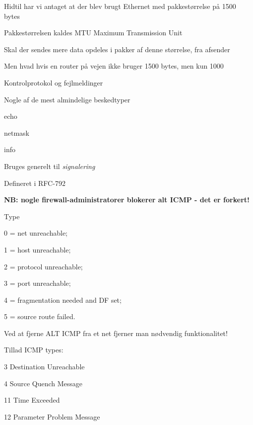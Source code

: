\documentclass[Screen16to9,17pt]{foils}
\begin{document}

\begin{list1}
\item Hidtil har vi antaget at der blev brugt Ethernet med pakkestørrelse på 1500 bytes
\item Pakkestørrelsen kaldes MTU Maximum Transmission Unit
\item Skal der sendes mere data opdeles i pakker af denne størrelse, fra afsender
\item Men hvad hvis en router på vejen ikke bruger 1500 bytes, men kun 1000
\end{list1}


\begin{list1}
\item Kontrolprotokol og fejlmeldinger
\item Nogle af de mest almindelige beskedtyper
\begin{list2}
\item echo
\item netmask
\item info
\end{list2}
\item Bruges generelt til \emph{signalering}
\item Defineret i RFC-792
\end{list1}

\centerline{\bf NB: nogle firewall-administratorer blokerer alt ICMP - det er forkert!}


\begin{list1}
\item Type
\begin{list2}
\item 0 = net unreachable;
\item 1 = host unreachable;
\item 2 = protocol unreachable;
\item 3 = port unreachable;
\item 4 = fragmentation needed and DF set;
\item 5 = source route failed.
\end{list2}
\item Ved at fjerne ALT ICMP fra et net fjerner man nødvendig funktionalitet!
\item Tillad ICMP types:
\begin{list2}
\item 3 Destination Unreachable
\item 4 Source Quench Message
\item 11 Time Exceeded
\item 12 Parameter Problem Message
\end{list2}
\end{list1}
\end{document}
